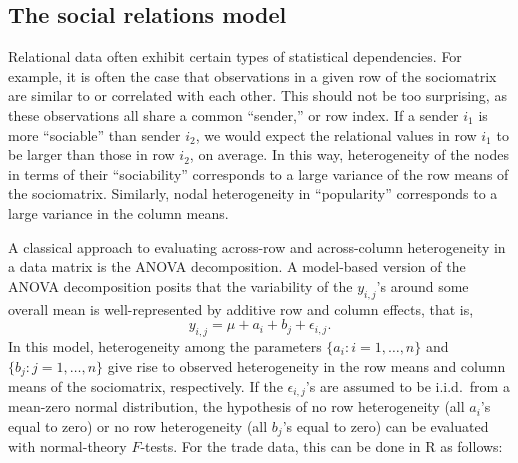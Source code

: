 \documentclass[11pt]{article}\usepackage[]{graphicx}\usepackage[]{color}
\begin{document}
\subsection{The social relations model}
Relational 
data often exhibit 
certain types of statistical dependencies.    
For example, it is often  the case that
observations in a given row of the sociomatrix are
similar to or correlated with each other. 
This should not
be too surprising, as these  observations all share a
common ``sender,'' or row index. 
If a sender $i_1$ is more ``sociable'' than sender $i_2$, we would 
expect the relational values in row $i_1$ to be larger than 
those in row $i_2$, on average. 
In this way, heterogeneity of the nodes in terms of their 
``sociability'' corresponds to a
large variance of the row means of the sociomatrix. 
Similarly, 
nodal heterogeneity in ``popularity'' corresponds to 
a large variance in the column means. 

A classical approach to evaluating across-row and across-column 
heterogeneity in a data matrix is the ANOVA decomposition. 
A model-based version of the ANOVA decomposition posits that 
the variability of 
the $y_{i,j}$'s around some overall mean is well-represented by 
additive row and column effects, that is, 
\[ 
y_{i,j} = \mu + a_i +b_j + \epsilon_{i,j}. 
\] 
In this model, 
heterogeneity among the parameters 
$\{a_i: i=1,\ldots, n\}$ and 
$\{b_j : j=1,\ldots, n\}$ give rise to 
observed heterogeneity in the row means 
and column means of the sociomatrix, respectively. 
If the $\epsilon_{i,j}$'s are assumed to be 
i.i.d.\ from a mean-zero normal distribution, 
the hypothesis of no row heterogeneity 
(all $a_i$'s equal to zero) or 
no row heterogeneity (all $b_j$'s equal to zero) 
can be evaluated with normal-theory $F$-tests. 
For the trade data, this can be done in {\sf R} as follows:
\end{document}
